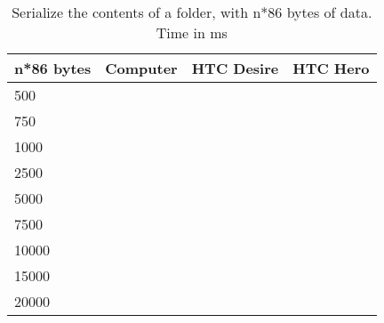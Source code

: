 \begin{table}
  \centering
  \caption{Serialize the contents of a folder, with n*86 bytes of data. Time in
  ms}
  \begin{tabular}{ | l | l | l | l |}
    \hline
    \textbf{n*86 bytes} & \textbf{Computer} & \textbf{HTC Desire} & \textbf{HTC Hero} \\ \hline
    500     &   &   & \\ \hline
    750     &   &   & \\ \hline
    1000    &   &   & \\ \hline
    2500    &   &   & \\ \hline     
    5000    &   &   & \\ \hline 
    7500    &   &   & \\ \hline 
    10000   &   &   & \\ \hline 
    15000   &   &   & \\ \hline 
    20000   &   &   & \\ \hline 
  \end{tabular}
  \label{tbl:folder:serializefolder}
\end{table}
